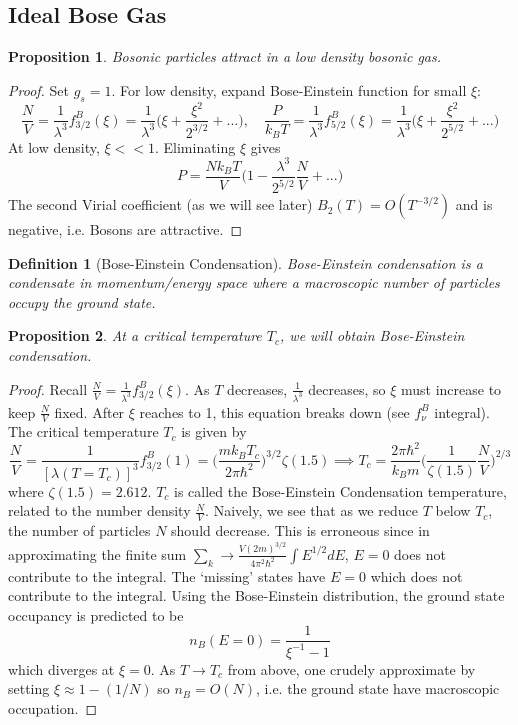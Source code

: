 \documentclass[a4paper]{article}
\theoremstyle{new}
\newtheorem{defi}{Definition}[section]
\newtheorem{prop}{Proposition}[section]
\begin{document}
\subsection{Ideal Bose Gas}
\begin{prop}
Bosonic particles attract in a low density bosonic gas.
\end{prop}
\begin{proof}
Set $g_s=1$. For low density, expand Bose-Einstein function for small $\xi$:
$$\frac{N}{V}=\frac{1}{\lambda^3}f_{3/2}^B(\xi)=\frac{1}{\lambda^3}\bigg(\xi+\frac{\xi^2}{2^{3/2}}+...\bigg),\quad \frac{P}{k_BT}=\frac{1}{\lambda^3}f_{5/2}^B(\xi)=\frac{1}{\lambda^3}\bigg(\xi+\frac{\xi^2}{2^{5/2}}+...\bigg)$$
At low density, $\xi<<1$. Eliminating $\xi$ gives
$$P=\frac{Nk_BT}{V}\bigg(1-\frac{\lambda^3}{2^{5/2}}\frac{N}{V}+...\bigg)$$
The second Virial coefficient (as we will see later) $B_2(T)=O(T^{-3/2})$ and is negative, i.e. Bosons are attractive.
\end{proof}
\begin{defi}[Bose-Einstein Condensation]
Bose-Einstein condensation is a condensate in momentum/energy space where a macroscopic number of particles occupy the ground state.
\end{defi}
\begin{prop}
At a critical temperature $T_c$, we will obtain Bose-Einstein condensation.
\end{prop}
\begin{proof}
Recall $\frac{N}{V}=\frac{1}{\lambda^3}f_{3/2}^B(\xi)$. As $T$ decreases, $\frac{1}{\lambda^3}$ decreases, so $\xi$ must increase to keep $\frac{N}{V}$ fixed. After $\xi$ reaches to 1, this equation breaks down (see $f_\nu^B$ integral). The critical temperature $T_c$ is given by
$$\frac{N}{V}=\frac{1}{[\lambda(T=T_c)]^3}f_{3/2}^B(1)=\bigg(\frac{mk_BT_c}{2\pi\hbar^2}\bigg)^{3/2}\zeta(1.5)\implies T_c=\frac{2\pi\hbar^2}{k_Bm}\bigg(\frac{1}{\zeta(1.5)}\frac{N}{V}\bigg)^{2/3}$$
where $\zeta(1.5)=2.612$. $T_c$ is called the Bose-Einstein Condensation temperature, related to the number density $\frac{N}{V}$. Naively, we see that as we reduce $T$ below $T_c$, the number of particles $N$ should decrease. This is erroneous since in approximating the finite sum $\sum_k\rightarrow\frac{V(2m)^{3/2}}{4\pi^2\hbar^2}\int E^{1/2}dE$, $E=0$ does not contribute to the integral. The `missing' states have $E=0$ which does not contribute to the integral. Using the Bose-Einstein distribution, the ground state occupancy is predicted to be
$$n_B(E=0)=\frac{1}{\xi^{-1}-1}$$
which diverges at $\xi=0$. As $T\rightarrow T_c$ from above, one crudely approximate by setting $\xi\approx1-(1/N)$ so $n_B=O(N)$, i.e. the ground state have macroscopic occupation. 
\end{proof}
\end{document}
